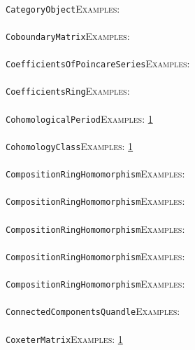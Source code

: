 \documentclass[a4paper,11pt]{report}
\begin{document}
{{ \\
 \texttt{CategoryObject}{\nobreakspace}{\nobreakspace}{\nobreakspace}{\nobreakspace}\textsc{Examples:} \\
 \\
 \texttt{CoboundaryMatrix}{\nobreakspace}{\nobreakspace}{\nobreakspace}{\nobreakspace}\textsc{Examples:} \\
 \\
 \texttt{CoefficientsOfPoincareSeries}{\nobreakspace}{\nobreakspace}{\nobreakspace}{\nobreakspace}\textsc{Examples:} \\
 \\
 \texttt{CoefficientsRing}{\nobreakspace}{\nobreakspace}{\nobreakspace}{\nobreakspace}\textsc{Examples:} \\
 \\
 \texttt{CohomologicalPeriod}{\nobreakspace}{\nobreakspace}{\nobreakspace}{\nobreakspace}\textsc{Examples:} \href{tutorial/chap10.html} {1}{\nobreakspace} \\
 \\
 \texttt{CohomologyClass}{\nobreakspace}{\nobreakspace}{\nobreakspace}{\nobreakspace}\textsc{Examples:} \href{../www/SideLinks/About/aboutGouter.html} {1}{\nobreakspace} \\
 \\
 \texttt{CompositionRingHomomorphism}{\nobreakspace}{\nobreakspace}{\nobreakspace}{\nobreakspace}\textsc{Examples:} \\
 \\
 \texttt{CompositionRingHomomorphism}{\nobreakspace}{\nobreakspace}{\nobreakspace}{\nobreakspace}\textsc{Examples:} \\
 \\
 \texttt{CompositionRingHomomorphism}{\nobreakspace}{\nobreakspace}{\nobreakspace}{\nobreakspace}\textsc{Examples:} \\
 \\
 \texttt{CompositionRingHomomorphism}{\nobreakspace}{\nobreakspace}{\nobreakspace}{\nobreakspace}\textsc{Examples:} \\
 \\
 \texttt{CompositionRingHomomorphism}{\nobreakspace}{\nobreakspace}{\nobreakspace}{\nobreakspace}\textsc{Examples:} \\
 \\
 \texttt{ConnectedComponentsQuandle}{\nobreakspace}{\nobreakspace}{\nobreakspace}{\nobreakspace}\textsc{Examples:} \\
 \\
 \texttt{CoxeterMatrix}{\nobreakspace}{\nobreakspace}{\nobreakspace}{\nobreakspace}\textsc{Examples:} \href{../www/SideLinks/About/aboutDavisComplex.html} {1}{\nobreakspace} \\
}}
\end{document}
